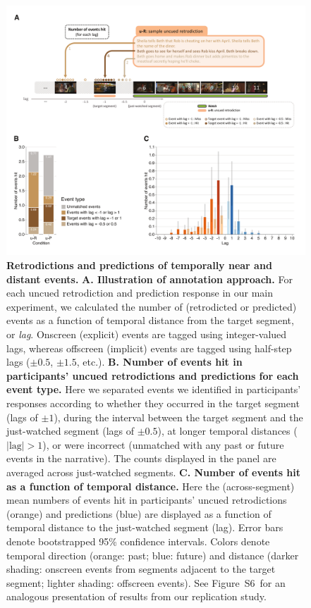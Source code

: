 \documentclass[10pt]{article}
\newcommand{\hitRates}{S6}
\begin{document}
\begin{figure}[tp]
  \centering
  \includegraphics[width=\textwidth]{results2}

  \caption{\textbf{Retrodictions and predictions of temporally near and distant events.} \textbf{A. Illustration of annotation approach.} For each uncued retrodiction and prediction response in our main experiment, we calculated the number of (retrodicted or predicted) events as a function of temporal distance from the target segment, or \textit{lag}. Onscreen (explicit) events are tagged using integer-valued lags, whereas offscreen (implicit) events are tagged using half-step lags ($\pm 0.5$, $\pm 1.5$, etc.). \textbf{B. Number of events hit in participants' uncued retrodictions and predictions for each event type.} Here we separated events we identified in participants' responses according to whether they occurred in the target segment (lags of $\pm 1$), during the interval between the target segment and the just-watched segment (lags of $\pm 0.5$), at longer temporal distances ($|\mathrm{lag}| > 1$), or were incorrect (unmatched with any past or future events in the narrative). The counts displayed in the panel are averaged across just-watched segments. \textbf{C. Number of events hit as a function of temporal distance.} Here the (across-segment) mean numbers of events hit in participants' uncued retrodictions (orange) and predictions (blue) are displayed as a function of temporal distance to the just-watched segment (lag). Error bars denote bootstrapped 95\% confidence intervals. Colors denote temporal direction (orange: past; blue: future) and distance (darker shading: onscreen events from segments adjacent to the target segment; lighter shading: offscreen events). See Figure~\hitRates~for an analogous presentation of results from our replication study.}

  \label{fig:result2}
\end{figure}
\end{document}
